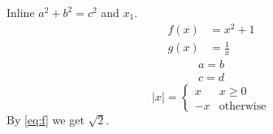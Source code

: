 \documentclass{article}
\begin{document}
Inline $a^2 + b^2 = c^2$ and \(x_1\).
\begin{align}
f(x) &= x^2 + 1 \label{eq:f}\\
g(x) &= \frac{1}{x}
\end{align}
\begin{gather*}
a = b \\
c = d
\end{gather*}
\[
|x| = \begin{cases} x & x \ge 0 \\ -x & \text{otherwise} \end{cases}
\]
By \eqref{eq:f} we get $\sqrt{2}$.
\end{document}
